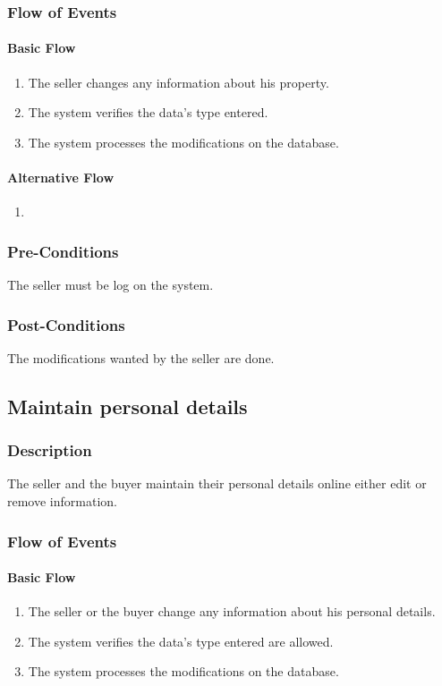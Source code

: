 \documentclass[a4paper,12pt]{article}
\begin{document}
\subsubsection{Flow of Events}
\paragraph{Basic Flow}
\begin{enumerate}
\item The seller changes any information about his property.
\item The system verifies the data's type entered.
\item The system processes the modifications on the database.
\end{enumerate}
\paragraph{Alternative Flow}
\begin{enumerate}
\item
\end{enumerate}
\subsubsection{Pre-Conditions}
The seller must be log on the system.
\subsubsection{Post-Conditions}
The modifications wanted by the seller are done.

\subsection{Maintain personal details}
\subsubsection{Description}
The seller and the buyer maintain their personal details online either edit or remove information.
\subsubsection{Flow of Events}
\paragraph{Basic Flow}
\begin{enumerate}
\item The seller or the buyer change any information about his personal details.
\item The system verifies the data's type entered are allowed.
\item The system processes the modifications on the database.
\end{enumerate}
\end{document}

